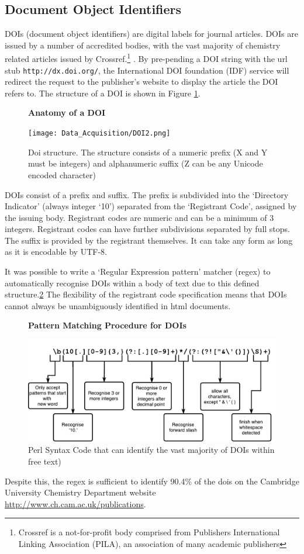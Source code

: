 \subsection{Document Object Identifiers}
\label{sec:DOI}
DOIs (document object identifiers) are digital labels for journal articles. DOIs are issued by a number of accredited bodies, with the vast majority of chemistry related articles issued by Crossref.\footnote{Crossref is a not-for-profit body comprised from Publishers International Linking Association (PILA), an association of many academic publishers} \cite{CROSSREF-FORMATION}. By pre-pending a DOI string with the url stub \texttt{http://dx.doi.org/}, the International DOI foundation (IDF) service will redirect the request to the publisher's website to display the article the DOI refers to. The structure of a DOI is shown in Figure \ref{fig:DOI}.
\begin{figure}[H]
    \centering
    \textbf{Anatomy of a DOI}\par\medskip
    \texttt{[image: Data\_Acquisition/DOI2.png]}
    \caption{Doi structure. The structure consists of a numeric prefix (X and Y must be integers) and alphanumeric suffix (Z can be any Unicode encoded character) \label{fig:DOI}}
\end{figure}
DOIs consist of a prefix and suffix. The prefix is subdivided into the ‘Directory Indicator’ (always integer ‘10’) separated from the ‘Registrant Code’, assigned by the issuing body. Registrant codes are numeric and can be a minimum of 3 integers. Registrant codes can have further subdivisions separated by full stops. The suffix is provided by the registrant themselves. It can take any form as long as it is encodable by UTF-8.


It was possible to write a `Regular Expression pattern' matcher (regex) to automatically recognise DOIs within a body of text due to this defined structure.\ref{fig:REGEX} The flexibility of the registrant code specification means that DOIs cannot always be unambiguously identified in html documents. 
\begin{figure}[H]
    \centering
    \textbf{Pattern Matching Procedure for DOIs}\par\medskip
    \includegraphics[scale=0.5]{Data_Acquisition/Regex.pdf}
    \caption{Perl Syntax Code that can identify the vast majority of DOIs within free text) \label{fig:REGEX}}
\end{figure}
Despite this, the regex is sufficient to identify 90.4\% of the dois on the Cambridge University Chemistry Department website \url{http://www.ch.cam.ac.uk/publications}. 
